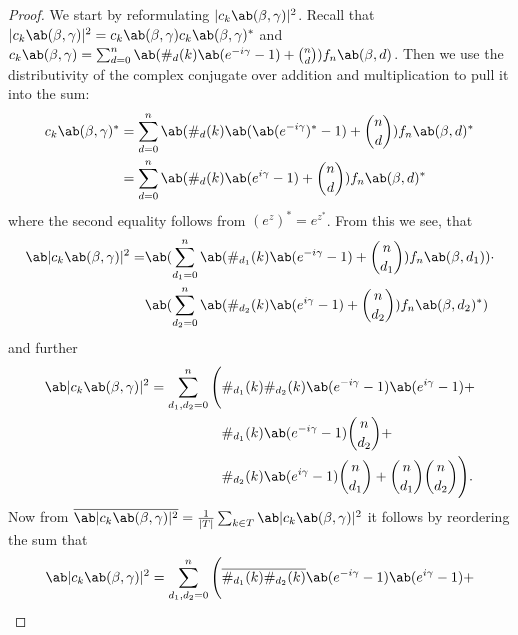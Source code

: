\begin{proof}
    We start by reformulating $|c_k \ab(\mangle, \pangle)|^2$. Recall that $|c_k \ab(\mangle, \pangle)|^2 = c_k \ab(\mangle, \pangle) c_k \ab(\mangle, \pangle)^*$ and $c_k \ab(\mangle, \pangle) = \sum_{d = 0}^n \ab(\#_d (k) \ab(e^{-i \pangle} - 1) + \binom{n}{d}) f_n \ab(\mangle, d)$. Then we use the distributivity of the complex conjugate over addition and multiplication to pull it into the sum:
    \begin{displaymath}
    \begin{aligned}
        c_k \ab(\mangle, \pangle)^* &= \sum_{d = 0}^n \ab(\#_d (k) \ab(\ab(e^{-i \pangle})^* - 1) + \binom{n}{d}) f_n \ab(\mangle, d)^* \\
                                    &= \sum_{d = 0}^n \ab(\#_d (k) \ab(e^{i \pangle} - 1) + \binom{n}{d}) f_n \ab(\mangle, d)^*
    \end{aligned}
    \end{displaymath}
    where the second equality follows from $(e^z)^* = e^{z^*}$. From this we see, that
    \begin{align*}
        \ab|c_k \ab(\mangle, \pangle)|^2 = &\ab(\sum_{d_1 = 0}^n \ab(\#_{d_1} (k) \ab(e^{-i \pangle} - 1) + \binom{n}{d_1}) f_n \ab(\mangle, d_1)) \cdot \\
                                           &\ab(\sum_{d_2 = 0}^n \ab(\#_{d_2} (k) \ab(e^{i \pangle} - 1) + \binom{n}{d_2}) f_n \ab(\mangle, d_2)^*) 
    \end{align*}
    and further
    \begin{align*}
        \ab|c_k \ab(\mangle, \pangle)|^2 = \sum_{d_1, d_2 = 0}^n \Bigg(&\#_{d_1} (k) \#_{d_2} (k) \ab(e^{-i \pangle} - 1) \ab(e^{i \pangle} - 1) + \\
                                                                      &\#_{d_1} (k) \ab(e^{-i \pangle} - 1) \binom{n}{d_2} + \\
                                                                     &\#_{d_2} (k) \ab(e^{i \pangle} - 1) \binom{n}{d_1} +
                                                                      \binom{n}{d_1} \binom{n}{d_2}\Bigg). 
    \end{align*}
    Now from $\overline{\ab|c_k \ab(\mangle, \pangle)|^2} = \frac{1}{|T|} \sum_{k \in T} \ab|c_k \ab(\mangle, \pangle)|^2$ it follows by reordering the sum that
    \begin{align*}
        \ab|c_k \ab(\mangle, \pangle)|^2 = \sum_{d_1, d_2 = 0}^n \Bigg(&\overline{\#_{d_1} (k) \#_{d_2} (k)} \ab(e^{-i \pangle} - 1) \ab(e^{i \pangle} - 1) + \\

\end{align*}
\end{proof}
